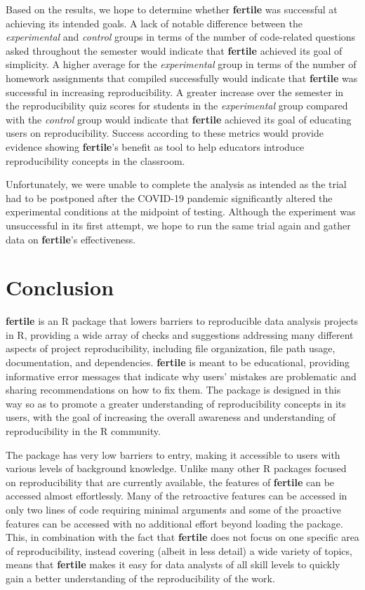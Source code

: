 \documentclass[APA,LATO1COL]{WileyNJD-v2}\usepackage[]{graphicx}\usepackage[]{color}
\newcommand{\R}{\textsf{R}\xspace}
\newcommand{\pkg}[1]{\textbf{#1}}
\begin{document}
Based on the results, we hope to determine whether \pkg{fertile} was successful at achieving its intended goals. A lack of notable difference between the \emph{experimental} and \emph{control} groups in terms of the number of code-related questions asked throughout the semester would indicate that \pkg{fertile} achieved its goal of simplicity. A higher average for the \emph{experimental} group in terms of the number of homework assignments that compiled successfully would indicate that \pkg{fertile} was successful in increasing reproducibility. A greater increase over the semester in the reproducibility quiz scores for students in the \emph{experimental} group compared with the \emph{control} group would indicate that \pkg{fertile} achieved its goal of educating users on reproducibility. Success according to these metrics would provide evidence showing \pkg{fertile}'s benefit as tool to help educators introduce reproducibility concepts in the classroom.

Unfortunately, we were unable to complete the analysis as intended as the trial had to be postponed after the COVID-19 pandemic significantly altered the experimental conditions at the midpoint of testing. Although the experiment was unsuccessful in its first attempt, we hope to run the same trial again and gather data on \pkg{fertile}'s effectiveness. 



\section{Conclusion}\label{sec:conclusion}


\pkg{fertile} is an \R package that lowers barriers to reproducible data analysis projects in \R, providing a wide array of checks and suggestions addressing many different aspects of project reproducibility, including file organization, file path usage, documentation, and dependencies.
\pkg{fertile} is meant to be educational, providing informative error messages that indicate why users' mistakes are problematic and sharing recommendations on how to fix them. The package is designed in this way so as to promote a greater understanding of reproducibility concepts in its users, with the goal of increasing the overall awareness and understanding of reproducibility in the \R community.

The package has very low barriers to entry, making it accessible to users with various levels of background knowledge. Unlike many other \R packages focused on reproducibility that are currently available, the features of \pkg{fertile} can be accessed almost effortlessly. Many of the retroactive features can be accessed in only two lines of code requiring minimal arguments and some of the proactive features can be accessed with no additional effort beyond loading the package. This, in combination with the fact that \pkg{fertile} does not focus on one specific area of reproducibility, instead covering (albeit in less detail) a wide variety of topics, means that \pkg{fertile} makes it easy for data analysts of all skill levels to quickly gain a better understanding of the reproducibility of the work.
\end{document}
